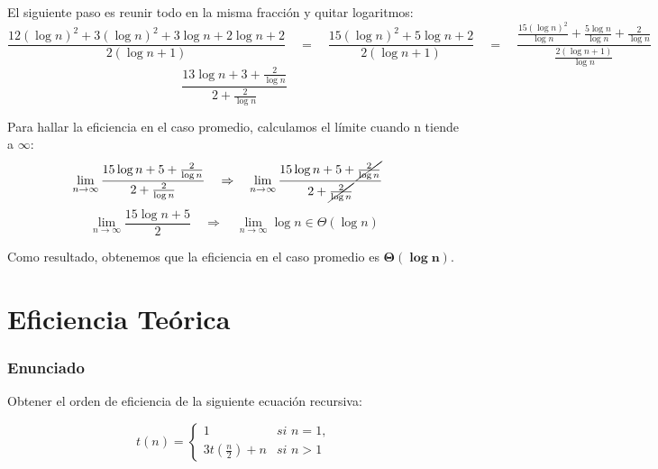 \documentclass[10pt,a4paper,spanish]{report}
\begin{document}
\begin{center}
El siguiente paso es reunir todo en la misma fracción y quitar logaritmos:
\begin{displaymath}
  \frac{12(\log n)^2 + 3(\log n)^2 + 3\log n + 2\log n + 2}{2(\log n + 1)} \quad = \quad \frac{15(\log n)^2 + 5\log n + 2}{2(\log n + 1)} \quad = \quad 
  \frac{\frac{15(\log n)^2}{\log n} + \frac{5\log n}{\log n} + \frac{2}{\log n}}{\frac{2(\log n + 1)}{\log n}}
\end{displaymath}
\begin{displaymath}
  \frac{13\log n + 3 + \frac{2}{\log n}}{2 + \frac{2}{\log n}}
\end{displaymath}

Para hallar la eficiencia en el caso promedio, calculamos el límite cuando n tiende a $\infty$:
\begin{displaymath}
  \lim_{n\rightarrow \infty} \frac{15\log n + 5 + \frac{2}{\log n}}{2 + \frac{2}{\log n}} \quad \Rightarrow \quad \lim_{n\rightarrow \infty} \frac{15\log n + 5 + \cancel{\frac{2}{\log n}}}{2 + \cancel{\frac{2}{\log n}}} \quad 
\end{displaymath}
\begin{displaymath}
 \lim_{n\rightarrow \infty} \frac{15 \log n + 5}{2} \quad \Rightarrow \quad \lim_{n\rightarrow \infty} \log n \in \Theta(\log n)
\end{displaymath}
\end{center}
Como resultado, obtenemos que la eficiencia en el caso promedio es $\mathbf{\Theta(\log n)}$.

\newpage

\chapter{\textcolor[rgb]{0.1,0.2,1}Eficiencia \textcolor[rgb]{0.1,0.2,1}Teórica}

\subsection{\textcolor[rgb]{0.1,0.2,1}Enunciado}

Obtener el orden de eficiencia de la siguiente ecuación recursiva:

\begin{equation*}
t(n) = 
\begin{cases}
1 & \textit{si } n = 1, \\
3t(\frac{n}{2}) + n & \textit{si } n > 1
\end{cases}
\end{equation*}
\end{document}
